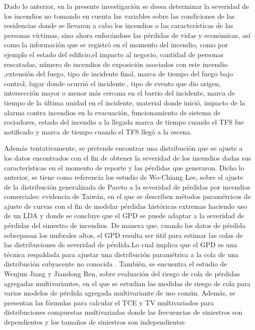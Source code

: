 \documentclass[
  oneside]{memoir}
\begin{document}
Dado lo anterior, en la presente investigación se desea determinar la
severidad de los incendios no tomando en cuenta las variables sobre las
condiciones de las residencias donde se llevaron a cabo los incendios o
las características de las personas víctimas, sino ahora enfocándose las
pérdidas de vidas y económicas, así como la información que se registró
en el momento del incendio, como por ejemplo el estado del edificio,el
impacto al negocio, cantidad de personas rescatadas, número de incendios
de exposición asociados con este incendio ,extensión del fuego, tipo de
incidente final, marca de tiempo del fuego bajo control, lugar donde
ocurrió el incidente., tipo de evento que dio origen, intersección mayor
o menor más cercana en el barrio del incidente, marca de tiempo de la
última unidad en el incidente, material donde inició, impacto de la
alarma contra incendios en la evacuación, funcionamiento de sistema de
rociadores, estado del incendio a la llegada marca de tiempo cuando el
TFS fue notificado y marca de tiempo cuando el TFS llegó a la escena.

Además tentativamente, se pretende encontrar una distribución que se
ajuste a los datos encontrados con el fin de obtener la severidad de los
incendios dadas sus características en el momento de reporte y las
pérdidas que generaron. Dicho lo anterior, se tiene como referencia los
estudio de Wo-Chiang Lee, sobre el ajuste de la distribución
generalizada de Pareto a la severidad de pérdidas por incendios
comerciales: evidencia de Taiwán, en el que se describen métodos
paramétricos de ajuste de curvas con el fin de modelar pérdidas
históricas extremas haciendo uso de un LDA y donde se concluye que el
GPD se puede adaptar a la severidad de pérdidas del siniestro de
incendios. De manera que, cuando los datos de pérdida sobrepasan los
umbrales altos, el GPD resulta ser útil para estimar las colas de las
distribuciones de severidad de pérdida.Lo cual implica que el GPD es una
técnica respaldada para ajustar una distribución paramétrica a la cola
de una distribución subyacente no conocida \citep{wo}. También, se
encuentra el estudio de Wenjun Jiang y Jiandong Ren, sobre evaluación
del riesgo de cola de pérdidas agregadas multivariantes, en el que se
estudian las medidas de riesgo de cola para varios modelos de pérdida
agregada multivariante de uso común. Además, se presentan las fórmulas
para calcular el TCE y TV multivariados para distribuciones compuestas
multivariadas donde las frecuencias de siniestros son dependientes y los
tamaños de siniestros son independientes\citep{jiang}
\end{document}
